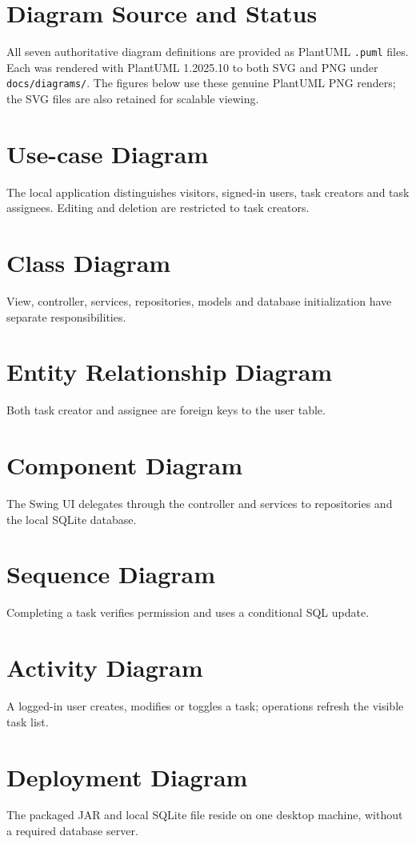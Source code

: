 \documentclass[11pt,a4paper]{article}
\begin{document}
\section{Diagram Source and Status}
All seven authoritative diagram definitions are provided as PlantUML \texttt{.puml} files. Each was rendered with PlantUML 1.2025.10 to both SVG and PNG under \texttt{docs/diagrams/}. The figures below use these genuine PlantUML PNG renders; the SVG files are also retained for scalable viewing.
\clearpage
\section{Use-case Diagram}
The local application distinguishes visitors, signed-in users, task creators and task assignees. Editing and deletion are restricted to task creators.
\clearpage
\section{Class Diagram}
View, controller, services, repositories, models and database initialization have separate responsibilities.
\clearpage
\section{Entity Relationship Diagram}
Both task creator and assignee are foreign keys to the user table.
\clearpage
\section{Component Diagram}
The Swing UI delegates through the controller and services to repositories and the local SQLite database.
\clearpage
\section{Sequence Diagram}
Completing a task verifies permission and uses a conditional SQL update.
\clearpage
\section{Activity Diagram}
A logged-in user creates, modifies or toggles a task; operations refresh the visible task list.
\clearpage
\section{Deployment Diagram}
The packaged JAR and local SQLite file reside on one desktop machine, without a required database server.
\end{document}
